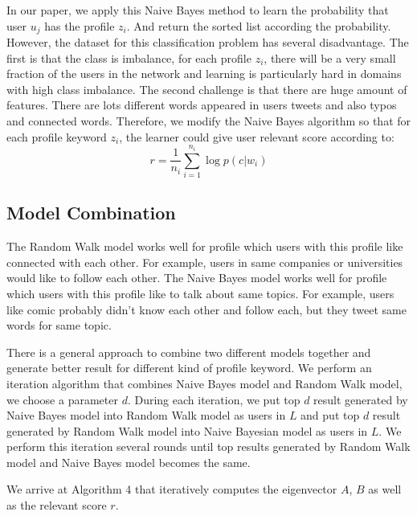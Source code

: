 \documentclass{article}
\begin{document}
In our paper, we apply this Naive Bayes method to learn the probability that user $u_j$ has the profile $z_i$. And return the sorted list according the probability.
However, the dataset for this classification problem has several disadvantage. The first is that the class is imbalance, for each profile $z_i$, there will be a very small fraction of the users in the network and learning is particularly hard in domains with high class imbalance. The second challenge is that there are huge amount of features. There are lots different words appeared in users tweets and also typos and connected words. Therefore, we modify the Naive Bayes algorithm so that for each profile keyword $z_i$, the learner could give user relevant score according to:
$$r = \frac{1}{n_i}\sum_{i=1}^{n_i} \log p(c|w_i)$$

\subsection{Model Combination}
The Random Walk model works well for profile which users with this profile like connected with each other. For example, users in same companies or universities would like to follow each other. The Naive Bayes model works well for profile which users with this profile like to talk about same topics. For example, users like comic probably didn't know each other and follow each, but they tweet same words for same topic.

There is a general approach to combine two different models together and generate better result for different kind of profile keyword.
We perform an iteration algorithm that combines Naive Bayes model and Random Walk model, we choose a parameter $d$. During each iteration, we put top $d$ result generated by Naive Bayes model into Random Walk model as users in $L$ and put top $d$ result generated by Random Walk model into Naive Bayesian model as users in $L$. We perform this iteration several rounds until top results generated by Random Walk model and Naive Bayes model becomes the same.

We arrive at Algorithm 4 that iteratively computes the eigenvector $A$, $B$ as well as the relevant score $r$.

\ifx \allfiles \undefined
\end{document}
